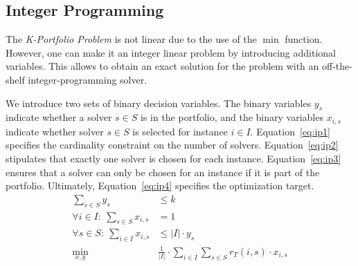 \documentclass[runningheads]{llncs}
\begin{document}
\subsection{Integer Programming}
\label{sec:approach:ip}

The \emph{K-Portfolio Problem} is not linear due to the use of the $\min$ function.
However, one can make it an integer linear problem by introducing additional variables.
This allows to obtain an exact solution for the problem with an off-the-shelf integer-programming solver.

We introduce two sets of binary decision variables. 
The binary variables $y_s$ indicate whether a solver $s \in S$ is in the portfolio, and 
the binary variables $x_{i,s}$ indicate whether solver $s \in S$ is selected for instance $i \in I$. 
Equation~\ref{eq:ip1} specifies the cardinality constraint on the number of solvers. 
Equation~\ref{eq:ip2} stipulates that exactly one solver is chosen for each instance. 
Equation~\ref{eq:ip3} ensures that a solver can only be chosen for an instance if it is part of the portfolio. 
Ultimately, Equation~\ref{eq:ip4} specifies the optimization target.%
\begin{align}
	\sum_{s \in S} y_s &\leq k \label{eq:ip1}\\
	\forall i\in I:~\sum_{s \in S} x_{i,s} &= 1 \label{eq:ip2}\\
	\forall s \in S:~\sum_{i \in I} x_{i,s} &\leq |I| \cdot y_s \label{eq:ip3}\\
	\min_{x,y} \quad & \frac{1}{|I|} \cdot \sum_{i \in I} \sum_{s \in S} r_T(i,s) \cdot x_{i,s} \label{eq:ip4}
\end{align}
\end{document}

